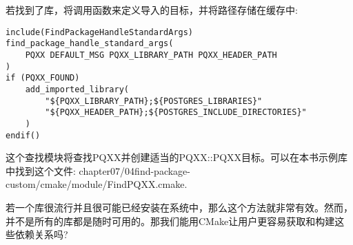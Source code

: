 若找到了库，将调用函数来定义导入的目标，并将路径存储在缓存中:

\begin{lstlisting}[style=styleCMake]
include(FindPackageHandleStandardArgs)
find_package_handle_standard_args(
	PQXX DEFAULT_MSG PQXX_LIBRARY_PATH PQXX_HEADER_PATH
)
if (PQXX_FOUND)
	add_imported_library(
		"${PQXX_LIBRARY_PATH};${POSTGRES_LIBRARIES}"
		"${PQXX_HEADER_PATH};${POSTGRES_INCLUDE_DIRECTORIES}"
	)
endif()
\end{lstlisting}

这个查找模块将查找PQXX并创建适当的PQXX::PQXX目标。可以在本书示例库中找到这个文件: chapter07/04find-package-custom/cmake/module/FindPQXX.cmake.

若一个库很流行并且很可能已经安装在系统中，那么这个方法就非常有效。然而，并不是所有的库都是随时可用的。那我们能用CMake让用户更容易获取和构建这些依赖关系吗?



























